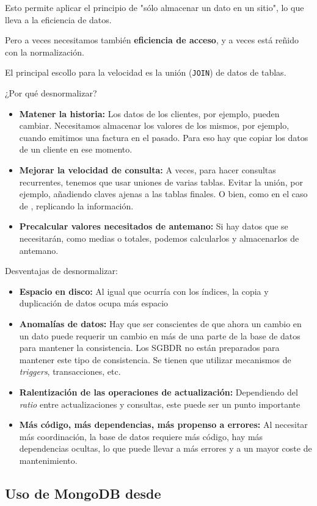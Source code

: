 Esto permite aplicar el principio de "sólo almacenar un dato en un sitio", lo que lleva a la eficiencia de datos.

Pero a veces necesitamos también \textbf{eficiencia de acceso}, y a veces está reñido con la normalización.

El principal escollo para la velocidad es la unión (\texttt{JOIN}) de datos de tablas.

¿Por qué desnormalizar?
\begin{itemize}
	\item \textbf{Matener la historia:} Los datos de los clientes, por ejemplo, pueden cambiar. Necesitamos almacenar los valores de los mismos, por ejemplo, cuando emitimos una factura en el pasado. Para eso hay que copiar los datos de un cliente en ese momento.
	\item \textbf{Mejorar la velocidad de consulta:} A veces, para hacer consultas recurrentes, tenemos que usar uniones de varias tablas. Evitar la unión, por ejemplo, añadiendo claves ajenas a las tablas finales. O bien, como en el caso de , replicando la información.
	\item \textbf{Precalcular valores necesitados de antemano:} Si hay datos que se necesitarán, como medias o totales, podemos calcularlos y almacenarlos de antemano.
\end{itemize}
Desventajas de desnormalizar:
\begin{itemize}
	\item \textbf{Espacio en disco:} Al igual que ocurría con los índices, la copia y duplicación de datos ocupa más espacio
	\item \textbf{Anomalías de datos:} Hay que ser conscientes de que ahora un cambio en un dato puede requerir un cambio en más de una parte de la base de datos para mantener la consistencia. Los SGBDR no están preparados para mantener este tipo de consistencia. Se tienen que utilizar mecanismos de \textit{triggers}, transacciones, etc.
	\item \textbf{Ralentización de las operaciones de actualización:} Dependiendo del \textit{ratio} entre actualizaciones y consultas, este puede ser un punto importante
	\item \textbf{Más código, más dependencias, más propenso a errores:} Al necesitar más coordinación, la base de datos requiere más código, hay más dependencias ocultas, lo que puede llevar a más errores y a un mayor coste de mantenimiento.
\end{itemize}
\subsection{Uso de MongoDB desde }
